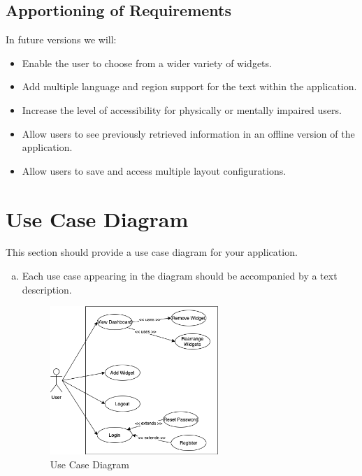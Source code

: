 \documentclass[]{article}
\begin{document}
	\subsection{Apportioning of Requirements}
	\label{sub:apportioning_of_requirements}
	In future versions we will:  
	\begin{itemize}
		\item Enable the user to choose from a wider variety of widgets.
		\item Add multiple language and region support for the text within the application.
		\item Increase the level of accessibility for physically or mentally impaired users.
		\item Allow users to see previously retrieved information in an offline version of the application.
		\item Allow users to save and access multiple layout configurations.
	\end{itemize}
	
	\newpage
	\section{Use Case Diagram}
	\label{sec:use_case_diagram}
	This section should provide a use case diagram for your application. 
	\begin{enumerate}[a)]
		\item Each use case appearing in the diagram should be accompanied by a text description. 
		
		\begin{figure}[h!]
			\begin{center}
				\includegraphics[width=0.6\textwidth]{Usecase.png}
			\end{center}
			\caption{Use Case Diagram}
			\label{fig:use case diagram}
		\end{figure}
	\end{enumerate}
	
\end{document}
